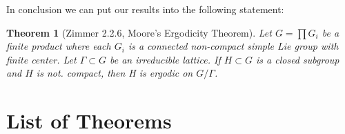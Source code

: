 \documentclass[
  12pt
]{article}
\newtheorem{thm}{Theorem}[section]
\theoremstyle{plain}
\begin{document}
  In conclusion we can put our results into the following statement:

  \begin{thm}[Zimmer 2.2.6, Moore's Ergodicity Theorem]
    \label{thm:2.2.6}
    Let $G = \prod G_i$ be a finite product where each $G_i$ is a connected
    non-compact simple Lie group with finite center. Let $\Gamma \subset G$ be
    an irreducible lattice. If $H \subset G$ is a closed subgroup and $H$ is
    not. compact, then H is ergodic on $G/\Gamma$.
  \end{thm}









\cleardoublepage


\section{List of Theorems}

{}
\listoffigures

{}
\printbibliography

\end{document}
